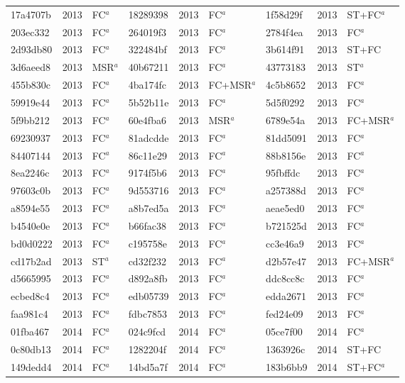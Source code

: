 \begin{longtable}{lll@{\hspace{10pt}}lll@{\hspace{10pt}}lll}
17a4707b & 2013 & FC$^{a}$ & 18289398 & 2013 & FC$^{a}$ & 1f58d29f & 2013 & ST+FC$^{a}$ \\
203ec332 & 2013 & FC$^{a}$ & 264019f3 & 2013 & FC$^{a}$ & 2784f4ea & 2013 & FC$^{a}$ \\
2d93db80 & 2013 & FC$^{a}$ & 322484bf & 2013 & FC$^{a}$ & 3b614f91 & 2013 & ST+FC \\
3d6aeed8 & 2013 & MSR$^{a}$ & 40b67211 & 2013 & FC$^{a}$ & 43773183 & 2013 & ST$^{a}$ \\
455b830c & 2013 & FC$^{a}$ & 4ba174fc & 2013 & FC+MSR$^{a}$ & 4c5b8652 & 2013 & FC$^{a}$ \\
59919e44 & 2013 & FC$^{a}$ & 5b52b11e & 2013 & FC$^{a}$ & 5d5f0292 & 2013 & FC$^{a}$ \\
5f9bb212 & 2013 & FC$^{a}$ & 60e4fba6 & 2013 & MSR$^{a}$ & 6789e54a & 2013 & FC+MSR$^{a}$ \\
69230937 & 2013 & FC$^{a}$ & 81adcdde & 2013 & FC$^{a}$ & 81dd5091 & 2013 & FC$^{a}$ \\
84407144 & 2013 & FC$^{a}$ & 86c11e29 & 2013 & FC$^{a}$ & 88b8156e & 2013 & FC$^{a}$ \\
8ea2246c & 2013 & FC$^{a}$ & 9174f5b6 & 2013 & FC$^{a}$ & 95fbffdc & 2013 & FC$^{a}$ \\
97603c0b & 2013 & FC$^{a}$ & 9d553716 & 2013 & FC$^{a}$ & a257388d & 2013 & FC$^{a}$ \\
a8594e55 & 2013 & FC$^{a}$ & a8b7ed5a & 2013 & FC$^{a}$ & aeae5ed0 & 2013 & FC$^{a}$ \\
b4540e0e & 2013 & FC$^{a}$ & b66fac38 & 2013 & FC$^{a}$ & b721525d & 2013 & FC$^{a}$ \\
bd0d0222 & 2013 & FC$^{a}$ & c195758e & 2013 & FC$^{a}$ & cc3e46a9 & 2013 & FC$^{a}$ \\
cd17b2ad & 2013 & ST$^{a}$ & cd32f232 & 2013 & FC$^{a}$ & d2b57e47 & 2013 & FC+MSR$^{a}$ \\
d5665995 & 2013 & FC$^{a}$ & d892a8fb & 2013 & FC$^{a}$ & ddc8cc8c & 2013 & FC$^{a}$ \\
ecbed8c4 & 2013 & FC$^{a}$ & edb05739 & 2013 & FC$^{a}$ & edda2671 & 2013 & FC$^{a}$ \\
faa981c4 & 2013 & FC$^{a}$ & fdbc7853 & 2013 & FC$^{a}$ & fed24e09 & 2013 & FC$^{a}$ \\
01fba467 & 2014 & FC$^{a}$ & 024c9fcd & 2014 & FC$^{a}$ & 05ce7f00 & 2014 & FC$^{a}$ \\
0c80db13 & 2014 & FC$^{a}$ & 1282204f & 2014 & FC$^{a}$ & 1363926c & 2014 & ST+FC \\
149dedd4 & 2014 & FC$^{a}$ & 14bd5a7f & 2014 & FC$^{a}$ & 183b6bb9 & 2014 & ST+FC$^{a}$ \\

\end{longtable}
